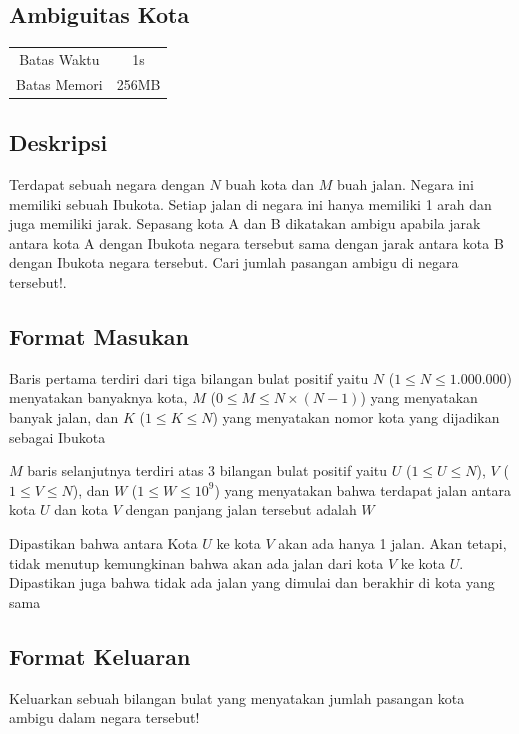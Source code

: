 \documentclass{article}
\begin{document}
\begin{center}

    
    \section*{Ambiguitas Kota} %

    \begin{tabular}{ | c c | }
        \hline
        Batas Waktu  & 1s \\    %
        Batas Memori & 256MB \\  %
        \hline
    \end{tabular}
\end{center}

\subsection*{Deskripsi}
Terdapat sebuah negara dengan $N$ buah kota dan $M$ buah jalan. Negara ini memiliki sebuah Ibukota. Setiap jalan di negara ini hanya memiliki 1 arah dan juga memiliki jarak. Sepasang kota A dan B dikatakan ambigu apabila jarak antara kota A dengan Ibukota negara tersebut sama dengan jarak antara kota B dengan Ibukota negara tersebut. Cari jumlah pasangan ambigu di negara tersebut!. 

\subsection*{Format Masukan}
Baris pertama terdiri dari tiga bilangan bulat positif yaitu $N$ ($1 \leq N \leq 1.000.000$) menyatakan banyaknya kota,
$M$ ($0 \leq M \leq N\times(N-1) $) yang menyatakan banyak jalan, dan $K$ ($1 \leq K \leq N$) yang menyatakan nomor kota yang dijadikan sebagai Ibukota

$M$ baris selanjutnya terdiri atas 3 bilangan bulat positif yaitu $U$ ($1 \leq U \leq N$), $V$ ($1 \leq V \leq N$), dan $W$ ($1 \leq W \leq 10^9$) yang menyatakan bahwa terdapat jalan antara kota $U$ dan kota $V$ dengan panjang jalan tersebut adalah $W$

Dipastikan bahwa antara Kota $U$ ke kota $V$ akan ada hanya 1 jalan. Akan tetapi, tidak menutup kemungkinan bahwa akan ada jalan dari kota $V$ ke kota $U$.
Dipastikan juga bahwa tidak ada jalan yang dimulai dan berakhir di kota yang sama
\subsection*{Format Keluaran}
Keluarkan sebuah bilangan bulat yang menyatakan jumlah pasangan kota ambigu dalam negara tersebut!
\end{document}
